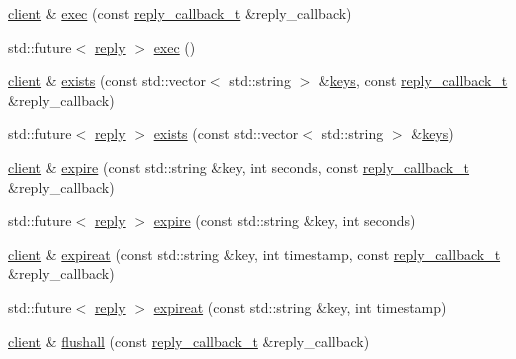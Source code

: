 \begin{DoxyCompactItemize}
\item 
\hyperlink{classcpp__redis_1_1client}{client} \& \hyperlink{classcpp__redis_1_1client_a76e78829c4ee2e1484268e465fab8997}{exec} (const \hyperlink{classcpp__redis_1_1client_a061a1140d36d2eaeda82b09a0bb3f9f2}{reply\+\_\+callback\+\_\+t} \&reply\+\_\+callback)
\item 
std\+::future$<$ \hyperlink{classcpp__redis_1_1reply}{reply} $>$ \hyperlink{classcpp__redis_1_1client_a93c5b232ae13b5107b6aa1ea5f70b70d}{exec} ()
\item 
\hyperlink{classcpp__redis_1_1client}{client} \& \hyperlink{classcpp__redis_1_1client_a11836c341d54a9d767cd37508bf87d73}{exists} (const std\+::vector$<$ std\+::string $>$ \&\hyperlink{classcpp__redis_1_1client_acb7845a206b2321e6919c2f38282c322}{keys}, const \hyperlink{classcpp__redis_1_1client_a061a1140d36d2eaeda82b09a0bb3f9f2}{reply\+\_\+callback\+\_\+t} \&reply\+\_\+callback)
\item 
std\+::future$<$ \hyperlink{classcpp__redis_1_1reply}{reply} $>$ \hyperlink{classcpp__redis_1_1client_a16ab72e15bd14a3fd2eb97194cea3d2d}{exists} (const std\+::vector$<$ std\+::string $>$ \&\hyperlink{classcpp__redis_1_1client_acb7845a206b2321e6919c2f38282c322}{keys})
\item 
\hyperlink{classcpp__redis_1_1client}{client} \& \hyperlink{classcpp__redis_1_1client_ab2c50e9f37a4e6a5dff059c991dbd15e}{expire} (const std\+::string \&key, int seconds, const \hyperlink{classcpp__redis_1_1client_a061a1140d36d2eaeda82b09a0bb3f9f2}{reply\+\_\+callback\+\_\+t} \&reply\+\_\+callback)
\item 
std\+::future$<$ \hyperlink{classcpp__redis_1_1reply}{reply} $>$ \hyperlink{classcpp__redis_1_1client_aeb2f8b475d5adf23a25ae066e1ff45f4}{expire} (const std\+::string \&key, int seconds)
\item 
\hyperlink{classcpp__redis_1_1client}{client} \& \hyperlink{classcpp__redis_1_1client_a7b5e1b089d68a0cb71f72fb6aecb0a63}{expireat} (const std\+::string \&key, int timestamp, const \hyperlink{classcpp__redis_1_1client_a061a1140d36d2eaeda82b09a0bb3f9f2}{reply\+\_\+callback\+\_\+t} \&reply\+\_\+callback)
\item 
std\+::future$<$ \hyperlink{classcpp__redis_1_1reply}{reply} $>$ \hyperlink{classcpp__redis_1_1client_af344a8ae784f7d4d529ea9cab276906c}{expireat} (const std\+::string \&key, int timestamp)
\item 
\hyperlink{classcpp__redis_1_1client}{client} \& \hyperlink{classcpp__redis_1_1client_a64e5730ff850ce517709e4e7fc511309}{flushall} (const \hyperlink{classcpp__redis_1_1client_a061a1140d36d2eaeda82b09a0bb3f9f2}{reply\+\_\+callback\+\_\+t} \&reply\+\_\+callback)

\end{DoxyCompactItemize}
